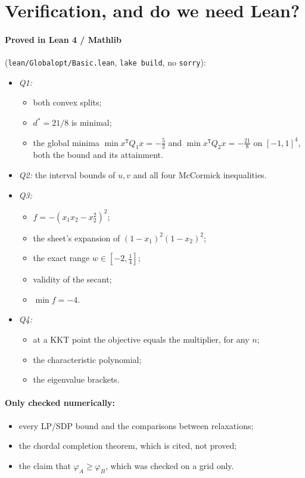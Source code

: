 \documentclass[11pt,fleqn]{article}
\renewcommand{\phi}{\varphi}
\newcommand{\trps}{^\texttt{T}}
\newcommand{\code}[1]{\texttt{#1}}
\begin{document}
\section*{Verification, and do we need Lean?}

\paragraph{Proved in Lean 4 / Mathlib} (\code{lean/Globalopt/Basic.lean}, \code{lake build}, no \code{sorry}):
\begin{itemize}
\item \emph{Q1:}
  \begin{itemize}
  \item both convex splits;
  \item $d^* = 21/8$ is minimal;
  \item the global minima $\min x\trps Q_1x = -\tfrac52$ and $\min x\trps Q_2 x = -\tfrac{21}{8}$ on
    $[-1,1]^4$, both the bound and its attainment.
  \end{itemize}
\item \emph{Q2:} the interval bounds of $u, v$ and all four McCormick inequalities.
\item \emph{Q3:}
  \begin{itemize}
  \item $f = -(x_1x_2-x_2^2)^2$;
  \item the sheet's expansion of $(1-x_1)^2(1-x_2)^2$;
  \item the exact range $w \in [-2,\tfrac14]$;
  \item validity of the secant;
  \item $\min f = -4$.
  \end{itemize}
\item \emph{Q4:}
  \begin{itemize}
  \item at a KKT point the objective equals the multiplier, for any $n$;
  \item the characteristic polynomial;
  \item the eigenvalue brackets.
  \end{itemize}
\end{itemize}

\paragraph{Only checked numerically:}
\begin{itemize}
\item every LP/SDP bound and the comparisons between relaxations;
\item the chordal completion theorem, which is cited, not proved;
\item the claim that $\phi_A \ge \phi_B$, which was checked on a grid only.
\end{itemize}
\end{document}
